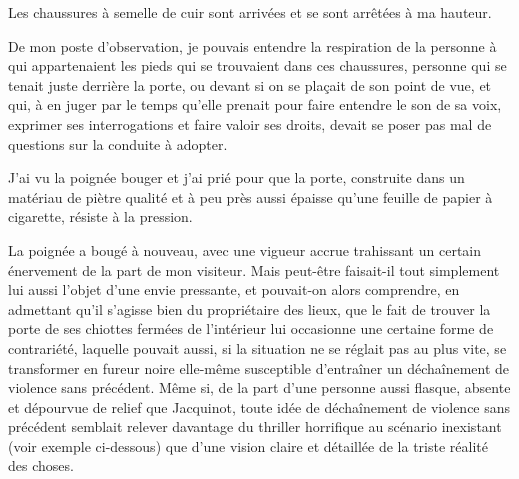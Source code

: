 \scene

Les chaussures à semelle de cuir sont arrivées et se sont arrêtées à ma hauteur.

De mon poste d’observation, je pouvais entendre la respiration de la personne à qui appartenaient les pieds qui se trouvaient dans ces chaussures, personne qui se tenait juste derrière la porte, ou devant si on se plaçait de son point de vue, et qui, à en juger par le temps qu’elle prenait pour faire entendre le son de sa voix, exprimer ses interrogations et faire valoir ses droits, devait se poser pas mal de questions sur la conduite à adopter.

J’ai vu la poignée bouger et j’ai prié pour que la porte, construite dans un matériau de piètre qualité et à peu près aussi épaisse qu’une feuille de papier à cigarette, résiste à la pression.

La poignée a bougé à nouveau, avec une vigueur accrue trahissant un certain énervement de la part de mon visiteur. Mais peut-être faisait-il tout simplement lui aussi l’objet d’une envie pressante, et pouvait-on alors comprendre, en admettant qu’il s’agisse bien du propriétaire des lieux, que le fait de trouver la porte de ses chiottes fermées de l’intérieur lui occasionne une certaine forme de contrariété, laquelle pouvait aussi, si la situation ne se réglait pas au plus vite, se transformer en fureur noire elle-même susceptible d’entraîner un déchaînement de violence sans précédent. Même si, de la part d’une personne aussi flasque, absente et dépourvue de relief que Jacquinot, toute idée de déchaînement de violence sans précédent semblait relever davantage du thriller horrifique au scénario inexistant (voir exemple ci-dessous) que d’une vision claire et détaillée de la triste réalité des choses.

